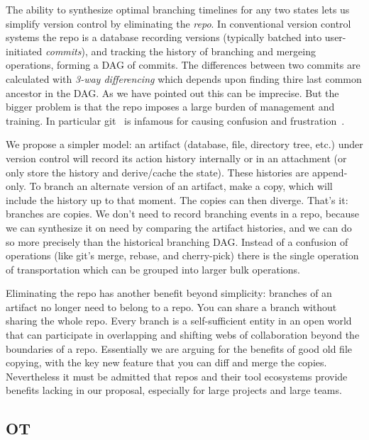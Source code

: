 \documentclass[english,submission]{programming}
\theoremstyle{definition}
\begin{document}
The ability to synthesize optimal branching timelines for any two states lets us simplify version control by eliminating the \textit{repo}. In conventional version control systems the repo is a database recording versions (typically batched into user-initiated \textit{commits}), and tracking the history of branching and mergeing operations, forming a DAG of commits. The differences between two commits are calculated with \textit{3-way differencing} which depends upon finding thire last common ancestor in the DAG. As we have pointed out this can be imprecise. But the bigger problem is that the repo imposes a large burden of management and training. In particular git~\cite{ProGit} is infamous for causing confusion and frustration~\cite{perez13, church2014case}.

We propose a simpler model: an artifact (database, file, directory tree, etc.) under version control will record its action history internally or in an attachment (or only store the history and derive/cache the state). These histories are append-only. To branch an alternate version of an artifact, make a copy, which will include the history up to that moment. The copies can then diverge. That's it: branches are copies. We don't need to record branching events in a repo, because we can synthesize it on need by comparing the artifact histories, and we can do so more precisely than the historical branching DAG.
Instead of a confusion of operations (like git's merge, rebase, and cherry-pick) there is the single operation of transportation which can be grouped into larger bulk operations.

Eliminating the repo has another benefit beyond simplicity: branches of an artifact no longer need to belong to a repo. You can share a branch without sharing the whole repo. Every branch is a self-sufficient entity in an open world that can participate in overlapping and shifting webs of collaboration beyond the boundaries of a repo. Essentially we are arguing for the benefits of good old file copying, with the key new feature that you can diff and merge the copies. Nevertheless it must be admitted that repos and their tool ecosystems provide benefits lacking in our proposal, especially for large projects and large teams.


\subsection{OT}
\end{document}
